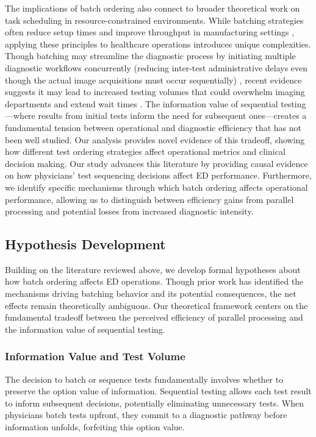 \documentclass[,,blindrev]{informs}
\begin{document}
The implications of batch ordering also connect to broader theoretical
work on task scheduling in resource-constrained environments. While
batching strategies often reduce setup times and improve throughput in
manufacturing settings \citep{Fowler2022}, applying these principles to
healthcare operations introduces unique complexities. Though batching
may streamline the diagnostic process by initiating multiple diagnostic
workflows concurrently (reducing inter-test administrative delays even
though the actual image acquisitions must occur sequentially)
\citep{song2017closing}, recent evidence suggests it may lead to
increased testing volumes that could overwhelm imaging departments and
extend wait times \citep[\citet{saghafian2015operations}]{Jessome2020}.
The information value of sequential testing---where results from initial
tests inform the need for subsequent ones---creates a fundamental
tension between operational and diagnostic efficiency that has not been
well studied. Our analysis provides novel evidence of this tradeoff,
showing how different test ordering strategies affect operational
metrics and clinical decision making. Our study advances this literature
by providing causal evidence on how physicians' test sequencing
decisions affect ED performance. Furthermore, we identify specific
mechanisms through which batch ordering affects operational performance,
allowing us to distinguish between efficiency gains from parallel
processing and potential losses from increased diagnostic intensity.

\subsection{Hypothesis Development}\label{sec:hypotheses}

Building on the literature reviewed above, we develop formal hypotheses
about how batch ordering affects ED operations. Though prior work has
identified the mechanisms driving batching behavior and its potential
consequences, the net effects remain theoretically ambiguous. Our
theoretical framework centers on the fundamental tradeoff between the
perceived efficiency of parallel processing and the information value of
sequential testing.

\subsubsection{Information Value and Test
Volume}\label{information-value-and-test-volume}

The decision to batch or sequence tests fundamentally involves whether
to preserve the option value of information. Sequential testing allows
each test result to inform subsequent decisions, potentially eliminating
unnecessary tests. When physicians batch tests upfront, they commit to a
diagnostic pathway before information unfolds, forfeiting this option
value.
\end{document}
